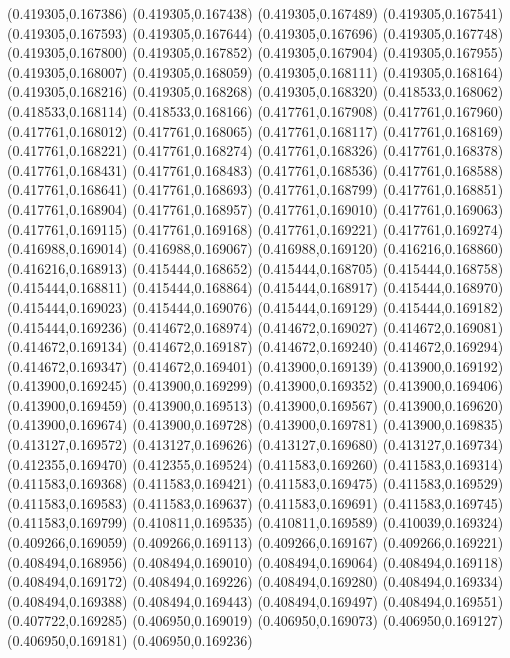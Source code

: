 (0.419305,0.167386)
(0.419305,0.167438)
(0.419305,0.167489)
(0.419305,0.167541)
(0.419305,0.167593)
(0.419305,0.167644)
(0.419305,0.167696)
(0.419305,0.167748)
(0.419305,0.167800)
(0.419305,0.167852)
(0.419305,0.167904)
(0.419305,0.167955)
(0.419305,0.168007)
(0.419305,0.168059)
(0.419305,0.168111)
(0.419305,0.168164)
(0.419305,0.168216)
(0.419305,0.168268)
(0.419305,0.168320)
(0.418533,0.168062)
(0.418533,0.168114)
(0.418533,0.168166)
(0.417761,0.167908)
(0.417761,0.167960)
(0.417761,0.168012)
(0.417761,0.168065)
(0.417761,0.168117)
(0.417761,0.168169)
(0.417761,0.168221)
(0.417761,0.168274)
(0.417761,0.168326)
(0.417761,0.168378)
(0.417761,0.168431)
(0.417761,0.168483)
(0.417761,0.168536)
(0.417761,0.168588)
(0.417761,0.168641)
(0.417761,0.168693)
(0.417761,0.168799)
(0.417761,0.168851)
(0.417761,0.168904)
(0.417761,0.168957)
(0.417761,0.169010)
(0.417761,0.169063)
(0.417761,0.169115)
(0.417761,0.169168)
(0.417761,0.169221)
(0.417761,0.169274)
(0.416988,0.169014)
(0.416988,0.169067)
(0.416988,0.169120)
(0.416216,0.168860)
(0.416216,0.168913)
(0.415444,0.168652)
(0.415444,0.168705)
(0.415444,0.168758)
(0.415444,0.168811)
(0.415444,0.168864)
(0.415444,0.168917)
(0.415444,0.168970)
(0.415444,0.169023)
(0.415444,0.169076)
(0.415444,0.169129)
(0.415444,0.169182)
(0.415444,0.169236)
(0.414672,0.168974)
(0.414672,0.169027)
(0.414672,0.169081)
(0.414672,0.169134)
(0.414672,0.169187)
(0.414672,0.169240)
(0.414672,0.169294)
(0.414672,0.169347)
(0.414672,0.169401)
(0.413900,0.169139)
(0.413900,0.169192)
(0.413900,0.169245)
(0.413900,0.169299)
(0.413900,0.169352)
(0.413900,0.169406)
(0.413900,0.169459)
(0.413900,0.169513)
(0.413900,0.169567)
(0.413900,0.169620)
(0.413900,0.169674)
(0.413900,0.169728)
(0.413900,0.169781)
(0.413900,0.169835)
(0.413127,0.169572)
(0.413127,0.169626)
(0.413127,0.169680)
(0.413127,0.169734)
(0.412355,0.169470)
(0.412355,0.169524)
(0.411583,0.169260)
(0.411583,0.169314)
(0.411583,0.169368)
(0.411583,0.169421)
(0.411583,0.169475)
(0.411583,0.169529)
(0.411583,0.169583)
(0.411583,0.169637)
(0.411583,0.169691)
(0.411583,0.169745)
(0.411583,0.169799)
(0.410811,0.169535)
(0.410811,0.169589)
(0.410039,0.169324)
(0.409266,0.169059)
(0.409266,0.169113)
(0.409266,0.169167)
(0.409266,0.169221)
(0.408494,0.168956)
(0.408494,0.169010)
(0.408494,0.169064)
(0.408494,0.169118)
(0.408494,0.169172)
(0.408494,0.169226)
(0.408494,0.169280)
(0.408494,0.169334)
(0.408494,0.169388)
(0.408494,0.169443)
(0.408494,0.169497)
(0.408494,0.169551)
(0.407722,0.169285)
(0.406950,0.169019)
(0.406950,0.169073)
(0.406950,0.169127)
(0.406950,0.169181)
(0.406950,0.169236)
